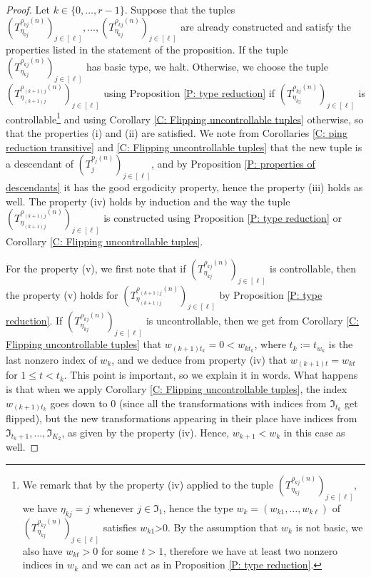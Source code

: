 \documentclass[11pt]{amsart}
\theoremstyle{definition}
\newcommand{\FI}{{\mathfrak I}}
\newcommand{\brac}[1]{\mathopen{}\left( #1 \mathclose{}\right)}
\begin{document}
\begin{proof}
Let $k\in\{0, \ldots, r-1\}$. Suppose that the tuples $\brac{T_{\eta_{0j}}^{\rho_{0j}(n)}}_{j\in[\ell]}, \ldots, \brac{T_{\eta_{kj}}^{\rho_{kj}(n)}}_{j\in[\ell]}$ are already constructed and satisfy the properties listed in the statement of the proposition. If the tuple $\brac{T_{\eta_{kj}}^{\rho_{kj}(n)}}_{j\in[\ell]}$ has basic type, we halt. Otherwise, we choose the tuple $\brac{T_{\eta_{(k+1)j}}^{\rho_{(k+1)j}(n)}}_{j\in[\ell]}$ using Proposition \ref{P: type reduction} if $\brac{T_{\eta_{kj}}^{\rho_{kj}(n)}}_{j\in[\ell]}$ is controllable\footnote{We remark that by the property (iv) applied to the tuple $\brac{T_{\eta_{kj}}^{\rho_{kj}(n)}}_{j\in[\ell]}$, we have $\eta_{kj} = j$ whenever $j\in\FI_1$, hence the type $w_k=(w_{k1}, \ldots, w_{k\ell})$ of $\brac{T_{\eta_{kj}}^{\rho_{kj}(n)}}_{j\in[\ell]}$ satisfies $w_{k1}$>0. By the assumption that $w_k$ is not basic, we also have $w_{kt} >0$ for some $t>1$, therefore we have at least two nonzero indices in $w_k$ and we can act as in Proposition \ref{P: type reduction}.} and using Corollary \ref{C: Flipping uncontrollable tuples} otherwise, so that the properties (i) and (ii) are satisfied. We note from Corollaries \ref{C: ping reduction transitive} and \ref{C: Flipping uncontrollable tuples} that the new tuple is a descendant of $\brac{T_j^{p_j(n)}}_{j\in[\ell]}$, and by Proposition \ref{P: properties of descendants} it has the good ergodicity property, hence the property (iii) holds as well. The property (iv) holds by induction and the way the tuple $\brac{T_{\eta_{(k+1)j}}^{\rho_{(k+1)j}(n)}}_{j\in[\ell]}$ is constructed using Proposition \ref{P: type reduction} or Corollary \ref{C: Flipping uncontrollable tuples}.

For the property (v), we first note that if $\brac{T_{\eta_{kj}}^{\rho_{kj}(n)}}_{j\in[\ell]}$ is controllable, then the property (v) holds for $\brac{T_{\eta_{(k+1)j}}^{\rho_{(k+1)j}(n)}}_{j\in[\ell]}$ by Proposition \ref{P: type reduction}. If $\brac{T_{\eta_{kj}}^{\rho_{kj}(n)}}_{j\in[\ell]}$ is uncontrollable, then we get from Corollary \ref{C: Flipping uncontrollable tuples} that $w_{(k+1)t_{k}} = 0<w_{kt_k}$, where $t_{k}:=t_{w_{k}}$ is the last nonzero index of $w_k$, and we deduce from property (iv) that $w_{(k+1)t} = w_{kt}$ for $1\leq t < t_k$. This point is important, so we explain it in words. What happens is that when we apply Corollary \ref{C: Flipping uncontrollable tuples}, the index $w_{(k+1)t_k}$ goes down to 0 (since all the transformations with indices from $\FI_{t_k}$ get flipped), but the new transformations appearing in their place have indices from $\FI_{t_k+1}, \ldots, \FI_{K_2}$, as given by the property (iv). Hence, $w_{k+1}<w_k$ in this case as well.


\end{proof}
\end{document}
